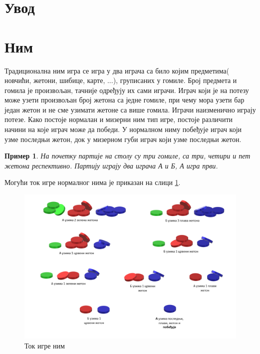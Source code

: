 \documentclass[a4paper]{article}
\newtheorem{example}{Пример}
\begin{document}

\newpage
{}
\tableofcontents

\newpage
{}
\section{Увод}
\label{sec:uvod}

\section{Ним}
\label{sec:nim}

Традиционална ним игра се игра у два играча са било којим предметима( новчићи, жетони, шибице, карте, ...), груписаних у гомиле. Број предмета и гомила је произвољан, тачније одређују их сами играчи. Играч који је на потезу може узети произвољан број жетона са једне гомиле, при чему мора узети бар један жетон и не сме узимати жетоне са више гомила. Играчи наизменично играју потезе. Како постоје нормалан и мизерни ним тип игре, постоје различити начини на које играч може да победи. У нормалном ниму побеђује играч који узме последњи жетон, док у мизерном губи играч који узме последњи жетон.

\begin{example}
На почетку партије на столу су три гомиле, са три, четири и пет жетона респективно. Партију играју два играча \textit{А} и \textit{Б}, \textit{А} игра први. 
\end{example}

Могући ток игре нормалног нима је приказан на слици \ref{fig:nimPrimer}.

\begin{figure}[H]
	\caption{Ток игре ним}
	\label{fig:nimPrimer}
	\begin{center}
		\includegraphics[width=\textwidth]{NimPrimer.png}
	\end{center}
\end{figure}
\end{document}
